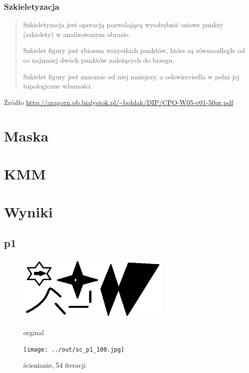 \documentclass[a4paper,12pt]{article}
\begin{document}
\subsubsection{Szkieletyzacja}
\begin{quote}
Szkieletyzacja jest operacją pozwalającą wyodrębnić osiowe punkty
(szkielety) w analizowanym obrazie.

Szkielet figury jest zbiorem wszystkich punktów, które są
równoodległe od co najmniej dwóch punktów należących
do brzegu.

Szkielet figury jest znacznie od niej mniejszy, a odzwierciedla w pełni jej
topologiczne własności.
\end{quote}
Źródło \url{http://aragorn.pb.bialystok.pl/~boldak/DIP/CPO-W05-v01-50pr.pdf}


\section{Maska}



\section{KMM}




\section{Wyniki}

\subsection{p1}

\begin{figure}[h!]
\begin{minipage}[t]{7.5cm}
\begin{center}
\includegraphics[width=7.5cm]{../in/p1.jpg}
\caption{orginal}
\end{center}
\end{minipage}
\hfill
\begin{minipage}[t]{7.5cm}
\begin{center}
\texttt{[image: ../out/sc\_p1\_100.jpg]}
\caption{ścienianie, 54 iteracji}
\end{center}
\end{minipage}
\end{figure}
\end{document}
